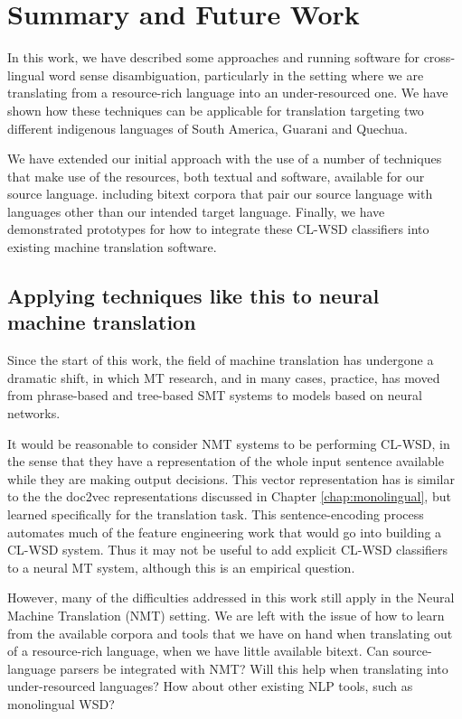 \chapter{Summary and Future Work}
\label{chap:conclusions}

In this work, we have described some approaches and running software for
cross-lingual word sense disambiguation, particularly in the setting where we
are translating from a resource-rich language into an under-resourced one.
We have shown how these techniques can be applicable for translation targeting
two different indigenous languages of South America, Guarani and Quechua.

We have extended our initial approach with the use of a number of techniques
that make use of the resources, both textual and software, available for our
source language.
including bitext corpora that pair our source language with languages other
than our intended target language.
Finally, we have demonstrated prototypes for how to integrate these CL-WSD
classifiers into existing machine translation software.


\section{Applying techniques like this to neural machine translation}
Since the start of this work, the field of machine translation has undergone a
dramatic shift, in which MT research, and in many cases, practice, has moved
from phrase-based and tree-based SMT systems to models based on neural
networks.

It would be reasonable to consider NMT systems to be performing CL-WSD, in the
sense that they have a representation of the whole input sentence available
while they are making output decisions. This vector representation has is
similar to the the doc2vec representations discussed in Chapter
\ref{chap:monolingual}, but learned specifically for the translation task. This
sentence-encoding process automates much of the feature engineering work that
would go into building a CL-WSD system. Thus it may not be useful to add
explicit CL-WSD classifiers to a neural MT system, although this is an
empirical question.

However, many of the difficulties addressed in this work still apply in the
Neural Machine Translation (NMT) setting. We are left with the issue of how to
learn from the available corpora and tools that we have on hand when
translating out of a resource-rich language, when we have little available
bitext. Can source-language parsers be integrated with NMT? Will this help when
translating into under-resourced languages?
How about other existing NLP tools, such as monolingual WSD?


